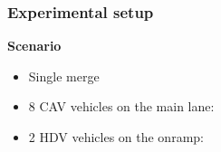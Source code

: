 \begin{frame}
    \frametitle{Experimental setup}
    \begin{example}
      \textbf{Scenario}
      \begin{itemize}
        \item Single merge 
        \item 8 CAV vehicles on the main lane: 
        \item 2 HDV vehicles on the onramp: 
      \end{itemize}
    \end{example}
\end{frame}
